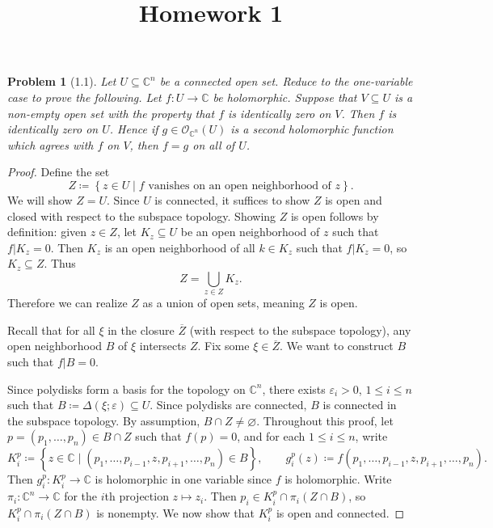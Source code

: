 \documentclass[11pt, letterpaper]{article}
\title{Homework 1}
\theoremstyle{plain}
\newtheorem{problem}{Problem}
\begin{document}
\makeproblem

\begin{problem}[1.1]
	Let $U\subseteq \mathbb{C} ^n$ be a connected open set. Reduce to the one-variable case to prove the following. Let $f : U \to \mathbb{C} $ be holomorphic. Suppose that $V\subseteq U$ is a non-empty open set with the property that $f$ is identically zero on $V$. Then $f$ is identically zero on $U$. Hence if $g\in \mathcal{O}_{\mathbb{C} ^n}(U)$ is a second holomorphic function which agrees with $f$ on $V$, then $f=g$ on all of $U$.
\end{problem}
\begin{proof}
	Define the set
	\[
		Z\coloneqq \left\{ z\in U\mid f\text{ vanishes on an open neighborhood of } z \right\} 
	.\]
	We will show $Z=U$. Since $U$ is connected, it suffices to show $Z$ is open and closed with respect to the subspace topology. Showing $Z$ is open follows by definition: given $z\in Z$, let $K_z\subseteq U$ be an open neighborhood of $z$ such that $f|K_z=0$. Then $K_z$ is an open neighborhood of all $k\in K_z$ such that $f|K_z=0$, so $K_z \subseteq Z$. Thus
	\[
		Z=\bigcup_{z\in Z} K_z
	.\]
	Therefore we can realize $Z$ as a union of open sets, meaning $Z$ is open.

	Recall that for all $\xi $ in the closure $\overline{Z}$ (with respect to the subspace topology), any open neighborhood $B$ of $\xi $ intersects $Z$. Fix some $\xi \in \overline{Z} $. We want to construct $B$ such that $f|B=0$.

	Since polydisks form a basis for the topology on $\mathbb{C} ^n$, there exists $\varepsilon_i>0$, $1\leq i\leq n$ such that $B\coloneqq \Delta (\xi;\varepsilon)\subseteq U$. Since polydisks are connected, $B$ is connected in the subspace topology. By assumption, $B \cap Z \neq \varnothing $. Throughout this proof, let $p=(p_1, \ldots ,p_n)\in B \cap Z$ such that $f(p)=0$, and for each $1\leq i\leq n$, write
	\[
		K_i^p \coloneqq \left\{ z\in\mathbb{C} \mid (p_1, \ldots ,p_{i-1} ,z,p_{i+1} , \ldots ,p_n)\in B \right\} ,\qquad g_i^p(z) \coloneqq f(p_1, \ldots ,p_{i-1} ,z,p_{i+1} , \ldots ,p_n)
	.\]
	Then $g_i^p : K_i^p \to \mathbb{C} $ is holomorphic in one variable since $f$ is holomorphic. Write $\pi _i : \mathbb{C} ^n \to \mathbb{C} $ for the $i$th projection $z\mapsto z_i$. Then $p_i\in K_i^p \cap \pi _i(Z \cap B)$, so $K_i^p \cap \pi _i(Z \cap B)$ is nonempty. We now show that $K_i^p$ is open and connected.


\end{proof}
\end{document}
